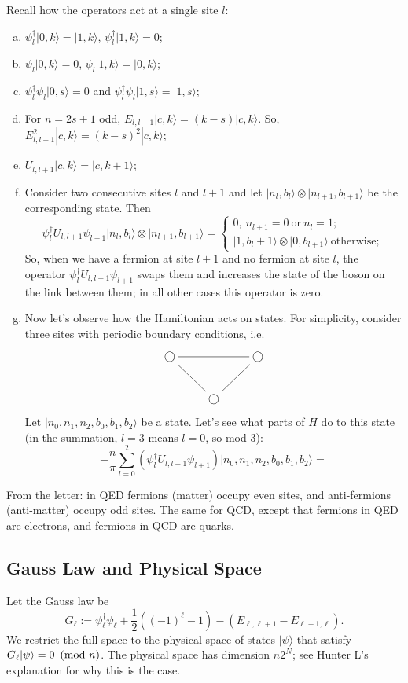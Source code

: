 	Recall how the operators act at a single site $l$:
	\begin{enumerate}[(a)]
	\item $\psi^\dagger_l |0,k\rangle = |1,k\rangle$, $\psi^\dagger_l |1,k\rangle = 0$;
	\item $\psi_l|0,k\rangle = 0$, $\psi_l|1,k\rangle = |0,k\rangle$;
	\item $\psi^\dagger_l \psi_l |0, s\rangle = 0$ and $\psi^\dagger_l \psi_l |1,s\rangle = |1,s\rangle$;
	\item For $n = 2s+1$ odd, $E_{l,l+1}|c,k\rangle = (k-s)|c,k\rangle$. So, $E_{l,l+1}^2|c,k\rangle = (k-s)^2 |c,k\rangle$;
	\item $U_{l,l+1} |c,k\rangle = |c,k+1\rangle$;
	\item Consider two consecutive sites $l$ and $l+1$ and let $|n_l,b_l\rangle \otimes |n_{l+1},b_{l+1}\rangle$ be the corresponding state. Then 
	\[
	\psi_l^\dagger U_{l,l+1} \psi_{l+1} |n_l,b_l\rangle \otimes |n_{l+1},b_{l+1}\rangle = \begin{cases}
	0, \ n_{l+1} = 0 \ \text{or} \ n_{l} = 1;\\
	|1,b_l+1\rangle \otimes |0,b_{l+1}\rangle \ \text{otherwise};
	\end{cases}
	\]
	So, when we have a fermion at site $l+1$ and no fermion at site $l$, the operator $\psi_l^\dagger U_{l,l+1} \psi_{l+1}$ swaps them and increases the state of the boson on the link between them; in all other cases this operator is zero.
	\item Now let's observe how the Hamiltonian acts on states. For simplicity, consider three sites with periodic boundary conditions, i.e.
	\[
	\xymatrix{
	\bigcirc \ar@{-}[rr]& & \bigcirc \\
	& \bigcirc\ar@{-}[ru] \ar@{-}[lu] &
	}
	\]
	Let $|n_0,n_1,n_2,b_0,b_1,b_2\rangle$ be a state. Let's see what parts of $H$ do to this state (in the summation, $l=3$ means $l = 0$, so mod $3$):
	\[
-\frac{n}{\pi}\sum_{l=0}^2 (\psi^\dagger_l U_{l,l+1} \psi_{l+1}) |n_0,n_1,n_2,b_0,b_1,b_2\rangle = 
	\]
	\end{enumerate}
	
	From the letter: in QED fermions (matter) occupy even sites, and anti-fermions (anti-matter) occupy odd sites. The same for QCD, except that fermions in QED are electrons, and fermions in QCD are quarks.
	
	\subsection{Gauss Law and Physical Space}
	Let the Gauss law be
		\begin{equation}\label{eq:1dQED_Gauss_law}
	G_\ell := \psi_\ell^\dagger \psi_\ell + \frac{1}{2}((-1)^\ell -1)-(E_{\ell,\ell+1}-E_{\ell-1,\ell}).
	\end{equation}
	We restrict the full space to the physical space of states $|\psi\rangle$ that satisfy
	$G_\ell|\psi\rangle= 0 \ \left(\mathrm{mod}\ n\right)$. 
	The physical space has dimension $n 2^N$; see Hunter L's explanation for why this is the case.
	
